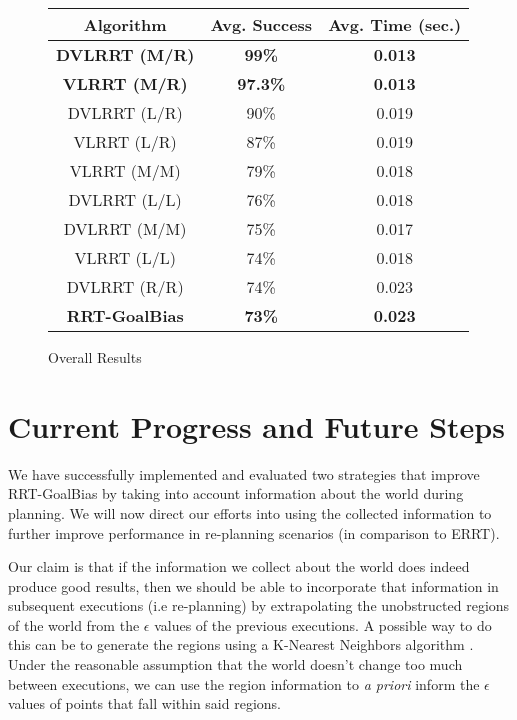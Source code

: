 \documentclass[10pt,twoside,twocolumn]{article}
\begin{document}
\begin{figure}[tp]
\begin{center}
\small{
\begin{tabular}{|ccc|}
\hline
Algorithm & Avg. Success & Avg. Time (sec.)\\
\hline
\bf{DVLRRT (M/R)} & \bf{99\%} & \bf{0.013}\\
\bf{VLRRT (M/R)} & \bf{97.3\%} & \bf{0.013}\\
DVLRRT (L/R) & 90\% & 0.019\\
VLRRT (L/R) & 87\% & 0.019\\
VLRRT (M/M) & 79\% & 0.018\\
DVLRRT (L/L) & 76\% & 0.018\\
DVLRRT (M/M) & 75\% & 0.017\\
VLRRT (L/L) & 74\% & 0.018\\
DVLRRT (R/R) & 74\% & 0.023\\
\bf{RRT-GoalBias} & \bf{73\%} & \bf{0.023}\\
\hline
\end{tabular}}
\end{center}
\caption{Overall Results}
\end{figure}

\section{Current Progress and Future Steps}

We have successfully implemented and evaluated two strategies that improve RRT-GoalBias by
taking into account information about the world during planning. We will now
direct our efforts into using the collected information to further improve performance
in re-planning scenarios (in comparison to ERRT). 

Our claim is that if the information we collect
about the world does indeed produce good results, then we should be able to incorporate that
information in subsequent executions (i.e re-planning) by extrapolating the unobstructed regions of
the world from the $\epsilon$ values of the previous executions. A possible way to do this can be
to generate the regions using a K-Nearest Neighbors algorithm \cite{citeulike:995135}. Under the reasonable assumption
that the world doesn't change too much between executions, we can use the region information to
\emph{a priori} inform the $\epsilon$ values of points that fall within said regions.


{}

\end{document}

